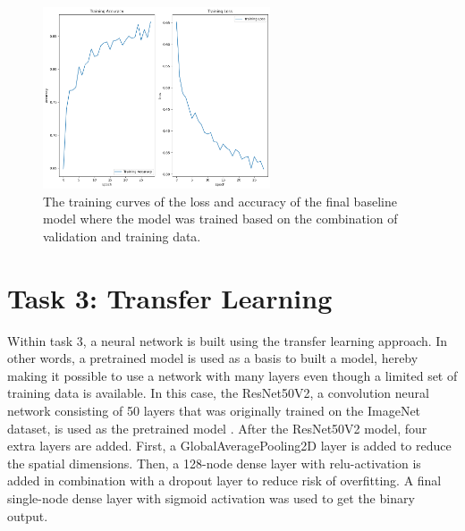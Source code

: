 \documentclass[conference]{IEEEtran}
\begin{document}
\begin{figure}[p] \centering \includegraphics[width=0.6\textwidth]{fig_task2_training_curves_train_final_model.png}
	\caption{The training curves of the loss and accuracy of the final baseline model where the model was trained based on the combination of validation and training data.} 	
	\label{fig:task2_curves_final} 
\end{figure}

\section{Task 3: Transfer Learning}\label{sec:task_3}


Within task 3, a neural network is built using the transfer learning approach. In other words, a pretrained model is used as a basis to built a model, hereby making it possible to use a network with many layers even though a limited set of training data is available. 
In this case, the ResNet50V2, a convolution neural network consisting of 50 layers that was originally trained on the ImageNet dataset, is used as the pretrained model \cite{resnet}. After the ResNet50V2 model, four extra layers are added. First, a GlobalAveragePooling2D layer is added to reduce the spatial dimensions. Then, a 128-node dense layer with relu-activation is added in combination with a dropout layer to reduce risk of overfitting. A final single-node dense layer with sigmoid activation was used to get the binary output.
\end{document}
